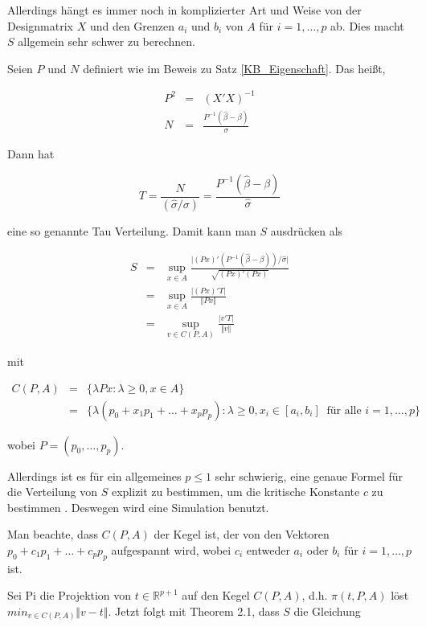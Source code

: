 \documentclass[12pt,a4paper]{article}
\theoremstyle{definition}
\theoremstyle{definition}
\theoremstyle{definition}
\theoremstyle{definition}
\begin{document}
Allerdings hängt es immer noch in komplizierter Art und Weise von der Designmatrix $X$ und den Grenzen $a_i$ und $b_i$ von $A$ für $i=1, \ldots, p$ ab. Dies macht $S$ allgemein sehr schwer zu berechnen.

Seien $P$ und $N$ definiert wie im Beweis zu Satz \ref{KB_Eigenschaft}. Das heißt, 

\begin{eqnarray*}
P^2 &=& (X'X)^{-1} \\
N &=& \frac{P^{-1}(\hat{\beta}-\beta)}{\sigma}
\end{eqnarray*}

Dann hat 

\begin{equation*}
T = \frac{N}{(\hat{\sigma} /\sigma)} = \frac{P^{-1}(\hat{\beta}-\beta)}{\hat{\sigma}}
\end{equation*}

eine so genannte \gls{Tau} Verteilung. Damit kann man $S$ ausdrücken als

\begin{eqnarray*}
S &=& \sup_{x \in A} \frac{\vert(Px)'(P^{-1} (\hat{\beta}-\beta)) / \hat{\sigma} \vert}{\sqrt{(Px)'(Px)}}\\
&=& \sup_{x \in A} \frac{\vert (Px)' T \vert}{\Vert Px \Vert} \\
&=& \sup_{v \in C(P,A)} \frac{\vert v'T \vert}{\Vert v \Vert}
\end{eqnarray*}

mit 

\begin{eqnarray*}
C(P,A) &=& \{ \lambda P x : \lambda \geq 0, x \in A \} \\
&=& \{ \lambda (p_0+x_1 p_1 + \ldots +x_p p_p) : \lambda \geq 0, x_i \in [a_i,b_i] ~ \text{ für alle } i=1,\ldots,p \}
\end{eqnarray*}

wobei $P=(p_0, \ldots, p_p)$. 

Allerdings ist es für ein allgemeines $p \leq 1$ sehr schwierig, eine genaue Formel für die Verteilung von $S$ explizit zu bestimmen, um die kritische Konstante $c$ zu bestimmen \cite[S.70, Z.18]{Liu64}. Deswegen wird eine Simulation benutzt.

Man beachte, dass $C(P,A)$ der Kegel ist, der von den Vektoren $p_0+c_1 p_1 + \ldots + c_p p_p $ aufgespannt wird, wobei $c_i$ entweder $a_i$ oder $b_i$ für $i=1,\ldots,p$ ist. 

Sei \gls{Pi} die Projektion von $t \in \mathbb{R}^{p+1}$ auf den Kegel $C(P,A)$, d.h. $\pi(t,P,A)$ löst $ min_{v \in C(P,A)} \Vert v-t \Vert$. Jetzt folgt mit \cite{Naiman87} Theorem 2.1, dass $S$ die Gleichung
\end{document}
